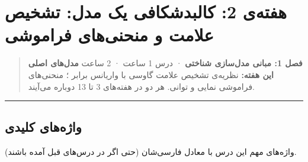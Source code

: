 \section{هفته‌ی 2: کالبدشکافی یک مدل: تشخیص علامت و منحنی‌های فراموشی}

\begin{quote}
\textbf{فصل 1: مبانی مدل‌سازی شناختی} · درس 1 ساعت ·  2 ساعت
\textbf{مدل‌های اصلی این هفته:} نظریه‌ی تشخیص علامت گاوسی با واریانس برابر
؛ منحنی‌های فراموشی نمایی و توانی. هر دو در هفته‌های 3 تا 13
دوباره می‌آیند.
\end{quote}

\begin{center}\rule{0.5\linewidth}{0.5pt}\end{center}

\subsection{واژه‌های کلیدی}

واژه‌های مهم این درس با معادل فارسی‌شان (حتی اگر در درس‌های قبل آمده
باشند).

